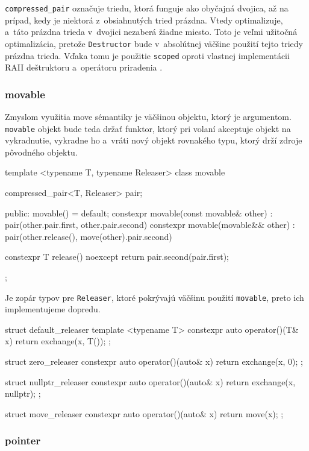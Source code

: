 \texttt{compressed\_pair} označuje triedu, ktorá funguje ako obyčajná dvojica, až na prípad, kedy je niektorá z~obsiahnutých tried prázdna. Vtedy optimalizuje, a~táto prázdna trieda v~dvojici nezaberá žiadne miesto. Toto je veľmi užitočná optimalizácia, pretože \texttt{Destructor} bude v~absolútnej väčšine použití tejto triedy prázdna trieda. Vďaka tomu je použitie \texttt{scoped} oproti vlastnej implementácii RAII deštruktoru a~operátoru priradenia .

\subsubsection{movable}

Zmyslom využitia move sémantiky je väčšinou  objektu, ktorý je argumentom. \texttt{movable} objekt bude teda držať funktor, ktorý pri volaní akceptuje objekt na vykradnutie, vykradne ho a~vráti nový objekt rovnakého typu, ktorý drží zdroje pôvodného objektu.

\begin{code}[fontsize=\footnotesize]
template <typename T, typename Releaser>
class movable
{   compressed_pair<T, Releaser> pair;

public:
    movable() = default;
    constexpr movable(const movable& other)
        : pair(other.pair.first, other.pair.second) {}
    constexpr movable(movable&& other)
        : pair(other.release(), move(other).pair.second) {}

    constexpr T release() noexcept { return pair.second(pair.first); }
};
\end{code}
Je zopár typov pre \texttt{Releaser}, ktoré pokrývajú väčšinu použití \texttt{movable}, preto ich implementujeme dopredu.
\begin{code}[fontsize=\footnotesize]
struct default_releaser
{   template <typename T>
    constexpr auto operator()(T& x) { return exchange(x, T()); } };
    
struct zero_releaser
{   constexpr auto operator()(auto& x) { return exchange(x, 0); } };
    
struct nullptr_releaser
{   constexpr auto operator()(auto& x) { return exchange(x, nullptr); } };

struct move_releaser
{   constexpr auto operator()(auto& x) { return move(x); } };
\end{code}

\subsubsection{pointer}


